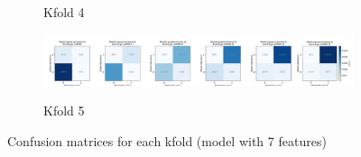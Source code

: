 \begin{figure}[!h]
\begin{subfigure}[b]{1\textwidth}
      \caption{Kfold 4}
      \label{fig:results_waterfall}
    \end{subfigure}
    \hfill
    \begin{subfigure}[b]{1\textwidth}
      \centering
      \includegraphics[width=1\textwidth]{./images/083_xgb_7_features_5fold_binary_confusion_matrices_per_binary_threshold_kfold4}\\
      \caption{Kfold 5}
      \label{fig:results_waterfall}
    \end{subfigure}
  \caption{Confusion matrices for each kfold (model with 7 features)}
\end{figure}


